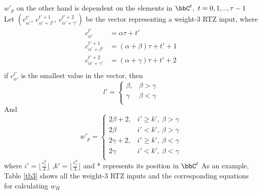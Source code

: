 \documentclass[11pt, oneside, dvipdfmx]{book}
\begin{document}
$w'_p$ on the other hand is dependent on the elements in $\bbC^{t},~t=0,1,..,\tau-1$
Let $(c_{\alpha'}^{t'},~c_{\alpha'+\beta'}^{t'+1},~c_{\alpha'+\gamma'}^{t'+2})$ be the vector representing a weight-$3$ RTZ input, where 
\begin{equation}
\begin{split}
c_{\alpha'}^{t'}&=\alpha\tau+ t'\\
c_{\alpha'+\beta'}^{t'+1}&=(\alpha+\beta)\tau+ t'+1\\
c_{\alpha'+\gamma'}^{t'+2}&=(\alpha+\gamma)\tau+ t'+2\\
\end{split}
\label{eq10}
\end{equation}
if $c_{\alpha'}^{t'}$ is the smallest value in the vector, then
\begin{equation}
l'=
\begin{cases}
\beta ,& \beta>\gamma \\
\gamma & \beta < \gamma\\
\end{cases}
\label{eq11}
\end{equation}
And 
\begin{equation}
w'_p=
\begin{cases}
2\beta+2,& i' \geq k', ~\beta>\gamma \\
2\beta & i' < k',~\beta>\gamma \\
2\gamma+2,& i' \geq k',~\beta<\gamma  \\
2\gamma & i' < k',~\beta<\gamma \\
\end{cases}
\label{eq12}
\end{equation}
where $i'=\lfloor\frac{c_*^2}{3}\rfloor$ ,$k'=\lfloor\frac{c_*^0}{3}\rfloor$ and * represents its position in $\bbC^t$\newline
As an example, Table \ref{tb3} shows all the weight-$3$ RTZ inputs and the corresponding equations for calculating $w_H$
\end{document}
